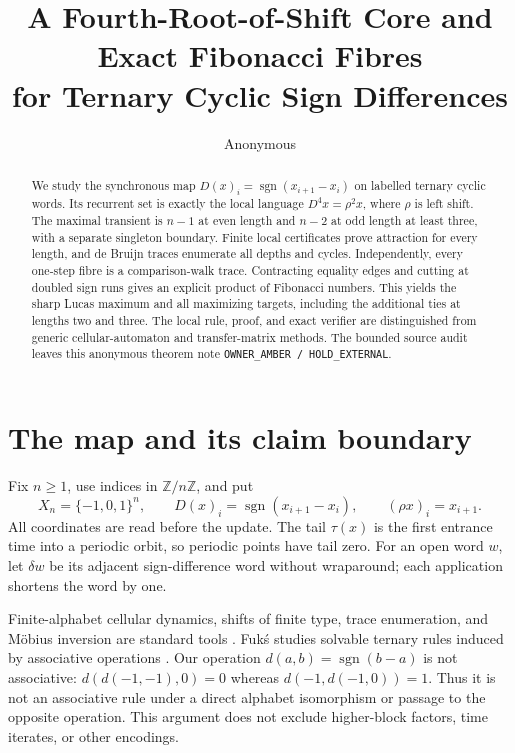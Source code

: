 \documentclass[a4paper,10pt]{amsart}
\title[Cyclic sign differences]{A Fourth-Root-of-Shift Core and Exact Fibonacci Fibres\protect\\ for Ternary Cyclic Sign Differences}
\author{Anonymous}
\date{}
\theoremstyle{remark}
\newcommand{\sgn}{\operatorname{sgn}}
\begin{document}
\begin{abstract}
We study the synchronous map $D(x)_i=\sgn(x_{i+1}-x_i)$ on labelled
ternary cyclic words. Its recurrent set is exactly the local language
$D^4x=\rho^2x$, where $\rho$ is left shift. The maximal transient is
$n-1$ at even length and $n-2$ at odd length at least three, with a separate
singleton boundary. Finite local certificates prove attraction for every
length, and de Bruijn traces enumerate all depths and cycles. Independently,
every one-step fibre is a comparison-walk trace. Contracting equality edges
and cutting at doubled sign runs gives an explicit product of Fibonacci
numbers. This yields the sharp Lucas maximum and all maximizing targets,
including the additional ties at lengths two and three. The local rule,
proof, and exact verifier are distinguished from generic cellular-automaton
and transfer-matrix methods. The bounded source audit leaves this anonymous
theorem note \texttt{OWNER\_AMBER / HOLD\_EXTERNAL}.
\end{abstract}
\maketitle

\section{The map and its claim boundary}
Fix $n\ge1$, use indices in $\mathbb Z/n\mathbb Z$, and put
\begin{equation}\label{eq:map}
X_n=\{-1,0,1\}^n,\qquad D(x)_i=\sgn(x_{i+1}-x_i),\qquad
(\rho x)_i=x_{i+1}.
\end{equation}
All coordinates are read before the update. The tail $\tau(x)$ is the
first entrance time into a periodic orbit, so periodic points have tail
zero. For an open word $w$, let $\delta w$ be its adjacent sign-difference
word without wraparound; each application shortens the word by one.

Finite-alphabet cellular dynamics, shifts of finite type, trace enumeration,
and M\"obius inversion are standard tools \cite{LindMarcus1995,Stanley2011}.
Fuk\'s studies solvable ternary rules induced by associative operations
\cite{Fuks2026}. Our operation $d(a,b)=\sgn(b-a)$ is not associative:
$d(d(-1,-1),0)=0$ whereas $d(-1,d(-1,0))=1$. Thus it is not an associative
rule under a direct alphabet isomorphism or passage to the opposite
operation. This argument does not exclude higher-block factors, time
iterates, or other encodings.
\end{document}
